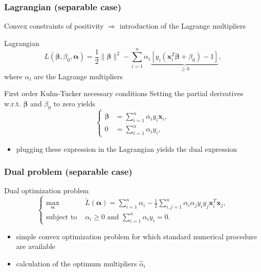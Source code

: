 \documentclass[compress, smaller, serif, 9pt]{beamer}
\newcommand{\structuretext}[1]{{\usebeamercolor[fg]{structure} #1}}
\newcommand{\doigt}{\structuretext{\noindent \Pisymbol{pzd}{43}}}
\newcommand{\bx}{{\boldsymbol{x}}}
\newcommand{\bbeta}{{\boldsymbol{\beta}}}
\newcommand{\balpha}{{\boldsymbol{\alpha}}}
\begin{document}
\begin{frame}
   \frametitle{Lagrangian (separable case)}
   
   Convex constraints of positivity $\Rightarrow$ introduction of the Lagrange multipliers
   \begin{block}{Lagrangian}
    $$ L(\bbeta,\beta_0,\balpha) = \frac{1}{2} \|\bbeta\|^2 - \sum_{i=1}^n \alpha_i 
    \underbrace{\left[ y_i ( \bx_i^T \bbeta + \beta_0 )-1\right]}_{\ge 0},$$
    where $\alpha_i$ are the Lagrange multipliers
   \end{block}

   
   \begin{block}{First order Kuhn-Tucker necessary conditions}
   Setting the partial derivatives w.r.t. $\bbeta$ and $\beta_0$ to zero yields
   $$\left\{ \begin{array}{ll}
    \widehat{\bbeta}& = \sum_{i=1}^n \alpha_i y_i \bx_i,\\
    0 &=  \sum_{i=1}^n \alpha_i y_i,
    \end{array}\right. $$
    \begin{itemize}
     \item plugging these expression in the Lagrangian yields the dual expression
    \end{itemize}

   \end{block}


\end{frame}  


\begin{frame}
   \frametitle{Dual problem (separable case)}
   
   
      \begin{block}{Dual optimization problem}
   $$\left\{ \begin{array}{lc}
    \max_{\balpha}    & \widetilde{L}(\balpha)  =  \sum_{i=1}^n \alpha_i  - \frac{1}{2}   \sum_{i,j=1}^n \alpha_i \alpha_j y_i y_j 
    \bx_i^T \bx_j,\\
    \textrm{subject to } & \alpha_i \ge 0 \textrm{ and } \sum_{i=1}^n \alpha_i y_i= 0. 
   \end{array}\right. $$

\begin{itemize}
 \item[\doigt]  simple convex optimization problem for which standard numerical procedure are available
 \item[\doigt] calculation of the optimum multipliers $\widehat{\alpha}_i$
\end{itemize}
   \end{block}



\end{frame}  
\end{document}
